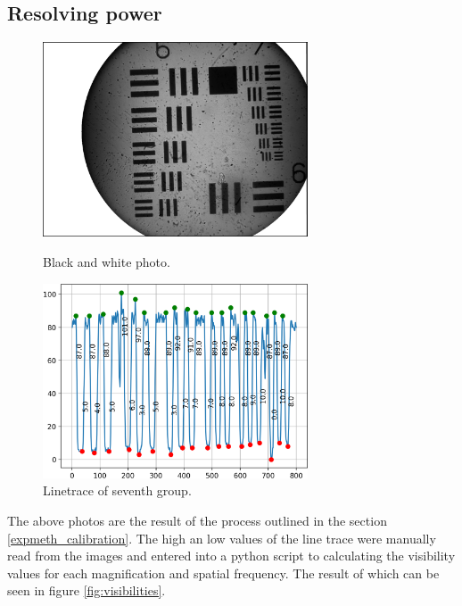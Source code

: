 \subsection{Resolving power}
\begin{figure}[h!]
    \centering
    \begin{minipage}{.5\textwidth}
      \centering
      \includegraphics[width=0.7\textwidth,keepaspectratio]{afbeeldingen/process_visibility/m3_bw.jpg}
      \caption{Black and white photo.}
      \label{fig:resolution_target}
    \end{minipage}%
    \begin{minipage}{.5\textwidth}
      \centering
      \includegraphics[width=0.7\textwidth,keepaspectratio]{afbeeldingen/process_visibility/m3_rpg_7.png}
      \caption{Linetrace of seventh group.}
      \label{fig:linetrace}
    \end{minipage}
\end{figure}



The above photos are the result of the process outlined in the section \ref{expmeth_calibration}. The high an low values of the line trace were manually read from the images and entered into a python script to calculating the visibility values for each magnification and spatial frequency. The result of which can be seen in figure \ref{fig:visibilities}.\\



